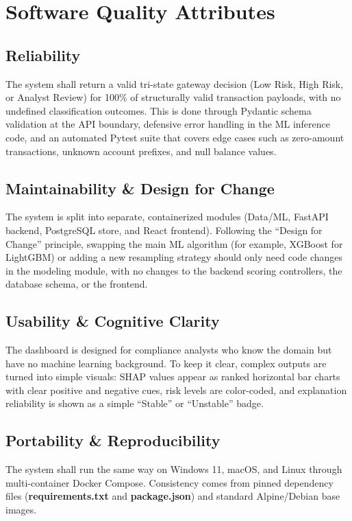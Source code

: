 \documentclass[12pt, a4paper]{report}
\begin{document}
\newpage
\section{Software Quality Attributes}

\subsection{Reliability}
The system shall return a valid tri-state gateway decision (Low Risk, High Risk, or Analyst Review) for 100\% of structurally valid transaction payloads, with no undefined classification outcomes. This is done through Pydantic schema validation at the API boundary, defensive error handling in the ML inference code, and an automated Pytest suite that covers edge cases such as zero-amount transactions, unknown account prefixes, and null balance values.

\subsection{Maintainability \& Design for Change}
The system is split into separate, containerized modules (Data/ML, FastAPI backend, PostgreSQL store, and React frontend). Following the ``Design for Change'' principle, swapping the main ML algorithm (for example, XGBoost for LightGBM) or adding a new resampling strategy should only need code changes in the modeling module, with no changes to the backend scoring controllers, the database schema, or the frontend.

\subsection{Usability \& Cognitive Clarity}
The dashboard is designed for compliance analysts who know the domain but have no machine learning background. To keep it clear, complex outputs are turned into simple visuals: SHAP values appear as ranked horizontal bar charts with clear positive and negative cues, risk levels are color-coded, and explanation reliability is shown as a simple ``Stable'' or ``Unstable'' badge.

\subsection{Portability \& Reproducibility}
The system shall run the same way on Windows 11, macOS, and Linux through multi-container Docker Compose. Consistency comes from pinned dependency files (\textbf{requirements.txt} and \textbf{package.json}) and standard Alpine/Debian base images.
\end{document}
